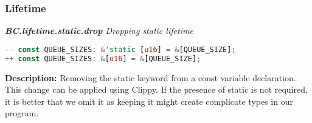 \subsubsection{Lifetime}
\noindent \textit{ \textbf{BC.lifetime.static.drop} Dropping static lifetime}

\begin{lstlisting}[language=Rust, style=colouredRust]
-- const QUEUE_SIZES: &'static [u16] = &[QUEUE_SIZE];
++ const QUEUE_SIZES: &[u16] = &[QUEUE_SIZE];

\end{lstlisting}

\noindent \textbf{Description:} Removing the static keyword from a const variable declaration. This change can be applied using Clippy. If the presence of static is not required, it is better that we omit it as keeping it might create complicate types in our program.

